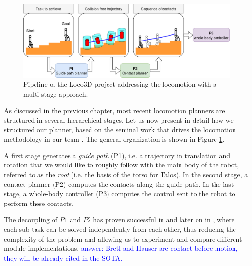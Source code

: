 \begin{figure}
    \centering
    \includegraphics[width=\textwidth]{Figures/Chapter_LEAS/pipeline.png}
    \caption{Pipeline of the Loco3D project addressing the locomotion with a multi-stage approach.}
    \label{fig:pipeline}
\end{figure}


As discussed in the previous chapter, most recent locomotion planners are structured in several hierarchical stages. Let us now present in detail how we structured our planner, based on the seminal work that drives the locomotion methodology in our team \cite{loco3d}.
The general organization is shown in Figure \ref{fig:pipeline}.

A first stage generates a \textit{guide path} (P1), i.e. a trajectory in translation and rotation that we would like to roughly follow with the main body of the robot, referred to as the \textit{root} (i.e. the basis of the torso for Talos). In the second stage, a contact planner (P2) computes the contacts along the guide path. In the last stage, a whole-body controller (P3) computes the control sent to the robot to perform these contacts.

The decoupling of $P1$ and $P2$ has proven successful in \cite{Escande2009Guide, bouyarmane} and later on in \cite{loco3d, RB-PRM}, where each sub-task can be solved independently from each other, thus reducing the complexity of the problem and allowing us to experiment and compare different module implementations. 
\textcolor{blue}{answer: Bretl and Hauser are contact-before-motion, they will be already cited in the SOTA.}

